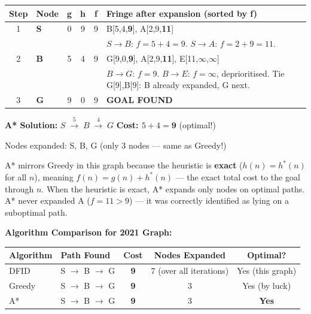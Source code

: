 \documentclass[12pt, a4paper]{article}
\newenvironment{answerbox}{\begin{mdframed}[style=answerframe]}{\end{mdframed}}
\newcommand{\goal}{\textcolor{green!55!black}{\textbf{GOAL FOUND}}}
\begin{document}
\vspace{0.4em}
\begin{center}
\renewcommand{\arraystretch}{1.3}
\small
\begin{tabular}{c|l|c|c|c|p{7.5cm}}
\toprule
\textbf{Step} & \textbf{Node} & \textbf{g} & \textbf{h} & \textbf{f} &
\textbf{Fringe after expansion (sorted by f)} \\
\midrule
1 & \textbf{S} & 0 & 9 & 9
  & B[5,4,\textbf{9}],\; A[2,9,\textbf{11}] \\
  & & & & & \footnotesize $S{\to}B$: $f{=}5{+}4{=}9$. $S{\to}A$: $f{=}2{+}9{=}11$. \\
\midrule
2 & \textbf{B} & 5 & 4 & 9
  & G[9,0,\textbf{9}],\; A[2,9,\textbf{11}],\; E[11,$\infty$,\textbf{$\infty$}] \\
  & & & & & \footnotesize $B{\to}G$: $f{=}9$. $B{\to}E$: $f{=}\infty$, deprioritised. Tie G[9],B[9]: B already expanded, G next. \\
\midrule
3 & \textbf{G} & 9 & 0 & 9
  & \goal \\
\bottomrule
\end{tabular}
\end{center}

\begin{answerbox}
\textbf{A* Solution:} $S \;\xrightarrow{5}\; B \;\xrightarrow{4}\; G$
\hfill \textbf{Cost: $5+4 = \mathbf{9}$} (optimal!)

Nodes expanded: S, B, G \quad(only 3 nodes — same as Greedy!)

A* mirrors Greedy in this graph because the heuristic is \textbf{exact} ($h(n)=h^*(n)$ for all $n$), meaning $f(n) = g(n) + h^*(n)$ — the exact total cost to the goal through $n$. When the heuristic is exact, A* expands only nodes on optimal paths. A* never expanded A ($f{=}11 > 9$) — it was correctly identified as lying on a suboptimal path.
\end{answerbox}

\vspace{0.8em}

\noindent\textbf{Algorithm Comparison for 2021 Graph:}
\begin{center}
\renewcommand{\arraystretch}{1.3}
\begin{tabular}{l|l|c|c|c}
\toprule
\textbf{Algorithm} & \textbf{Path Found} & \textbf{Cost} & \textbf{Nodes Expanded} & \textbf{Optimal?} \\
\midrule
DFID   & S $\to$ B $\to$ G & \textbf{9} & 7 (over all iterations) & Yes (this graph) \\
Greedy & S $\to$ B $\to$ G & \textbf{9} & 3 & Yes (by luck) \\
A*     & S $\to$ B $\to$ G & \textbf{9} & 3 & \textbf{Yes} \\
\bottomrule
\end{tabular}
\end{center}
\end{document}

